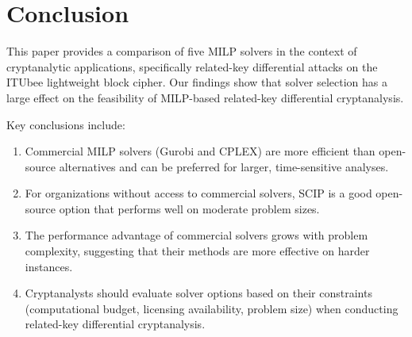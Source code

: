 \section{Conclusion}

This paper provides a comparison of five MILP solvers in the context of cryptanalytic applications, specifically related-key differential attacks on the ITUbee lightweight block cipher. Our findings show that solver selection has a large effect on the feasibility of MILP-based related-key differential cryptanalysis.

Key conclusions include:
\begin{enumerate}
    \item Commercial MILP solvers (Gurobi and CPLEX) are more efficient than open-source alternatives and can be preferred for larger, time-sensitive analyses.
    \item For organizations without access to commercial solvers, SCIP is a good open-source option that performs well on moderate problem sizes.
    \item The performance advantage of commercial solvers grows with problem complexity, suggesting that their methods are more effective on harder instances.
    \item Cryptanalysts should evaluate solver options based on their constraints (computational budget, licensing availability, problem size) when conducting related-key differential cryptanalysis.
\end{enumerate}


